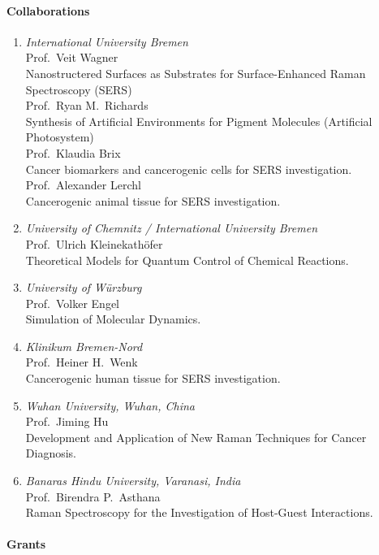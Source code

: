 \paragraph{Collaborations}
\begin{enumerate}
\item {\sl International University Bremen}\\
      Prof.\ Veit Wagner\\
      Nanostructered Surfaces as Substrates for Surface-Enhanced Raman Spectroscopy (SERS)
\\
      Prof.\ Ryan M.\ Richards\\
      Synthesis of Artificial Environments for Pigment Molecules (Artificial Photosystem)
\\
      Prof.\ Klaudia Brix\\
      Cancer biomarkers and cancerogenic cells for SERS investigation.
\\
      Prof.\ Alexander Lerchl\\
      Cancerogenic animal tissue for SERS investigation.
\item {\sl University of Chemnitz / International University Bremen}\\
      Prof.\ Ulrich Kleinekath\"{o}fer\\
      Theoretical Models for Quantum Control of Chemical Reactions.
\item {\sl University of W\"{u}rzburg}\\
      Prof.\ Volker Engel\\
      Simulation of Molecular Dynamics.
\item {\sl Klinikum Bremen-Nord}\\
      Prof.\ Heiner H.\ Wenk\\
      Cancerogenic human tissue for SERS investigation.
\item {\sl Wuhan University, Wuhan, China}\\
      Prof.\ Jiming Hu\\
      Development and Application of New Raman Techniques for Cancer Diagnosis.
\item {\sl Banaras Hindu University, Varanasi, India}\\
      Prof.\ Birendra P.\ Asthana\\
      Raman Spectroscopy for the Investigation of Host-Guest Interactions.
\end{enumerate}


\paragraph{Grants}

